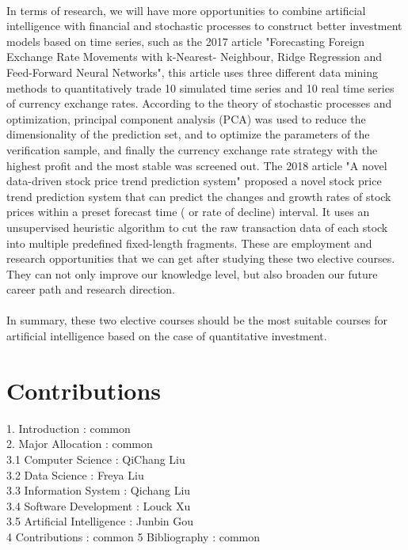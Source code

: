 \documentclass{article}
\begin{document}
    \\
    In terms of research, we will have more opportunities to combine artificial intelligence with financial and stochastic processes to construct better investment models based on time series, such as the 2017 article "Forecasting Foreign Exchange Rate Movements with k-Nearest- Neighbour, Ridge Regression and Feed-Forward Neural Networks", this article uses three different data mining methods to quantitatively trade 10 simulated time series and 10 real time series of currency exchange rates. According to the theory of stochastic processes and optimization, principal component analysis (PCA) was used to reduce the dimensionality of the prediction set, and to optimize the parameters of the verification sample, and finally the currency exchange rate strategy with the highest profit and the most stable was screened out. The 2018 article "A novel data-driven stock price trend prediction system" proposed a novel stock price trend prediction system that can predict the changes and growth rates of stock prices within a preset forecast time ( or rate of decline) interval. It uses an unsupervised heuristic algorithm to cut the raw transaction data of each stock into multiple predefined fixed-length fragments. These are employment and research opportunities that we can get after studying these two elective courses. They can not only improve our knowledge level, but also broaden our future career path and research direction.\\
    \\
    In summary, these two elective courses should be the most suitable courses for artificial intelligence based on the case of quantitative investment.



	
	
	\section{Contributions}
	    1. Introduction : common\\
	    2. Major Allocation : common\\
	    3.1 Computer Science : QiChang Liu\\
	    3.2 Data Science : Freya Liu\\
	    3.3 Information System : Qichang Liu\\
	    3.4 Software Development : Louck Xu\\
	    3.5 Artificial Intelligence : Junbin Gou\\
	    4 Contributions : common
	    5 Bibliography : common
	    
\end{document}
